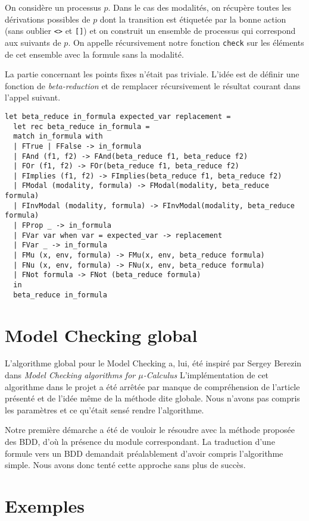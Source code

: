 \documentclass[a4paper]{article}
\begin{document}
On considère un processus $p$. Dans le cas des modalités, on récupère
toutes les dérivations possibles de $p$ dont la transition est
étiquetée par la bonne action (sans oublier \texttt{<>}
et \texttt{[]}) et on construit un ensemble de processus qui
correspond aux suivants de $p$. On appelle récursivement notre
fonction \texttt{check} sur les éléments de cet ensemble avec la
formule sans la modalité.

La partie concernant les points fixes n'était pas triviale. L'idée est
de définir une fonction de \emph{beta-reduction} et de remplacer
récursivement le résultat courant dans l'appel suivant.

\begin{lstlisting}[language=caml]
let beta_reduce in_formula expected_var replacement =
  let rec beta_reduce in_formula =
  match in_formula with
  | FTrue | FFalse -> in_formula
  | FAnd (f1, f2) -> FAnd(beta_reduce f1, beta_reduce f2)
  | FOr (f1, f2) -> FOr(beta_reduce f1, beta_reduce f2)
  | FImplies (f1, f2) -> FImplies(beta_reduce f1, beta_reduce f2)
  | FModal (modality, formula) -> FModal(modality, beta_reduce formula)
  | FInvModal (modality, formula) -> FInvModal(modality, beta_reduce formula)
  | FProp _ -> in_formula
  | FVar var when var = expected_var -> replacement
  | FVar _ -> in_formula
  | FMu (x, env, formula) -> FMu(x, env, beta_reduce formula)
  | FNu (x, env, formula) -> FNu(x, env, beta_reduce formula)
  | FNot formula -> FNot (beta_reduce formula)
  in
  beta_reduce in_formula
\end{lstlisting}



\section{Model Checking global}

L'algorithme global pour le Model Checking a, lui, été inspiré par
Sergey Berezin dans \emph{Model Checking algorithms for
$\mu$-Calculus} L'implémentation de cet algorithme dans le projet a
été arrêtée par manque de compréhension de l'article présenté et de
l'idée même de la méthode dite globale. Nous n'avons pas compris les
paramètres et ce qu'était sensé rendre l'algorithme.

Notre première démarche a été de vouloir le résoudre avec la méthode
proposée des BDD, d'où la présence du module correspondant. La
traduction d'une formule vers un BDD demandait préalablement d'avoir
compris l'algorithme simple. Nous avons donc tenté cette approche sans
plus de succès.


\section{Exemples}
\end{document}
